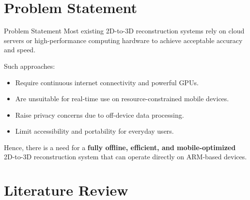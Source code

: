 \documentclass[11pt]{beamer}
\begin{document}
\section{Problem Statement}

\begin{frame}{Problem Statement}
Most existing 2D-to-3D reconstruction systems rely on cloud servers or high-performance computing hardware to achieve acceptable accuracy and speed.

\medskip
Such approaches:
\begin{itemize}
\item Require continuous internet connectivity and powerful GPUs.
\item Are unsuitable for real-time use on resource-constrained mobile devices.
\item Raise privacy concerns due to off-device data processing.
\item Limit accessibility and portability for everyday users.
\end{itemize}

\medskip
Hence, there is a need for a \textbf{fully offline, efficient, and mobile-optimized} 2D-to-3D reconstruction system that can operate directly on ARM-based devices.
\end{frame}


\section{Literature Review}
\end{document}
